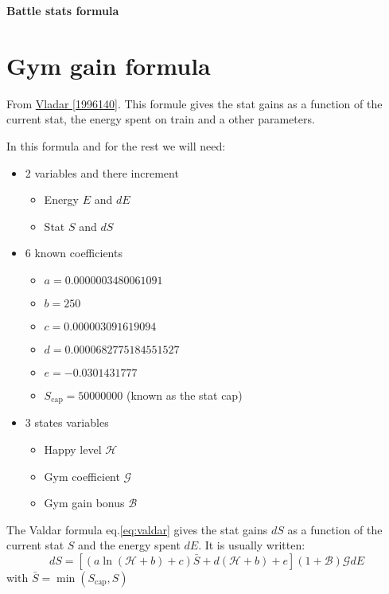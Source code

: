 \documentclass[12pt]{article}
\def\happy{\mathcal{H}}
\def\gym{\mathcal{G}}
\def\bonus{\mathcal{B}}
\def\Sc{S_\text{cap}}
\begin{document}
\begin{center}
    \bf\Huge Battle stats formula
\end{center}

\section{Gym gain formula}
From \href{https://www.torn.com/forums.php?p=threads&f=61&t=16003284&b=0&a=0&start=0&to=17684755}{Vladar [1996140]}.
This formule gives the stat gains as a function of the current stat, the energy spent on train and a other parameters.

\par In this formula and for the rest we will need:
\begin{itemize}
    \item 2 variables and there increment
    \begin{itemize}
        \item Energy $E$ and $dE$
        \item Stat $S$ and $dS$
    \end{itemize}
    \item 6 known coefficients
        \begin{itemize}
            \item $a = 0.0000003480061091$
            \item $b = 250$
            \item $c = 0.000003091619094$
            \item $d = 0.0000682775184551527$
            \item $e = -0.0301431777$
            \item $\Sc = 50000000$ (known as the stat cap)
        \end{itemize}
    \item 3 states variables
    \begin{itemize}
        \item Happy level $\happy$
        \item Gym coefficient $\gym$
        \item Gym gain bonus $\bonus$
    \end{itemize}
\end{itemize}

The Valdar formula eq.\eqref{eq:valdar} gives the stat gains $dS$ as a function of the current stat $S$ and the energy spent $dE$. It is usually written:
\begin{equation}
    dS = \left[ (a\ln(\happy+b)+c) \bar{S} + d(\happy+b) + e \right](1+\bonus)\gym dE
    \label{eq:valdar}
\end{equation}
with $\bar{S} = \min(\Sc, S)$
\end{document}
